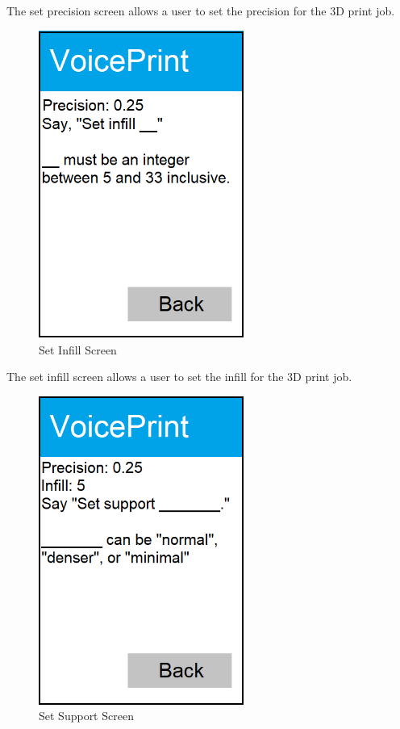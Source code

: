 The set precision screen allows a user to set the precision for the 3D print job.

\newpage

\begin{figure}[h!]
	\centering
   	\includegraphics[width=0.60\textwidth]{images/Activity3.png}
   	\caption{Set Infill Screen}
\end{figure}

The set infill screen allows a user to set the infill for the 3D print job.

\newpage

\begin{figure}[h!]
	\centering
   	\includegraphics[width=0.60\textwidth]{images/Activity4.png}
   	\caption{Set Support Screen}
\end{figure}

